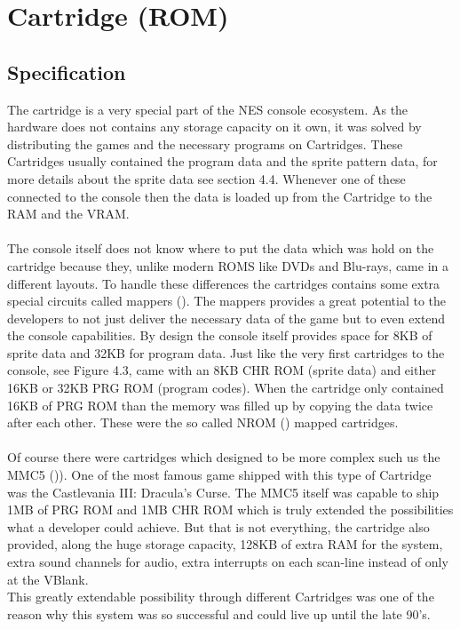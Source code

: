 \documentclass[]{report}
\begin{document}
\section{Cartridge (ROM)}

\subsection{Specification}
The cartridge is a very special part of the NES console ecosystem. As the hardware does not contains any storage capacity on it own, it was solved by distributing the games and the necessary programs on Cartridges. These Cartridges usually contained the program data and the sprite pattern data, for more details about the sprite data see section 4.4. Whenever one of these connected to the console then the data is loaded up from the Cartridge to the RAM and the VRAM.
\paragraph{ }
The console itself does not know where to put the data which was hold on the cartridge because they, unlike modern ROMS like DVDs and Blu-rays, came in a different layouts. To handle these differences the cartridges contains some extra special circuits called mappers (\cite{MPPR}). The mappers provides a great potential to the developers to not just deliver the necessary data of the game but to even extend the console capabilities. By design the console itself provides space for 8KB of sprite data and 32KB for program data. Just like the very first cartridges to the console, see Figure 4.3, came with an 8KB CHR ROM (sprite data) and either 16KB or 32KB PRG ROM (program codes). When the cartridge only contained 16KB of PRG ROM than the memory was filled up by copying the data twice after each other. These were the so called NROM (\cite{NROM}) mapped cartridges.
\paragraph{ }
Of course there were cartridges which designed to be more complex such us the MMC5 (\cite{MMC5})). One of the most famous game shipped with this type of Cartridge was the Castlevania III: Dracula's Curse.
The MMC5 itself was capable to ship 1MB of PRG ROM and 1MB CHR ROM which is truly extended the possibilities what a developer could achieve. But that is not everything, the cartridge also provided, along the huge storage capacity, 128KB of extra RAM for the system, extra sound channels for audio, extra interrupts on each scan-line instead of only at the VBlank. 
\\
This greatly extendable possibility through different Cartridges was one of the reason why this system was so successful and could live up until the late 90's.
\end{document}
